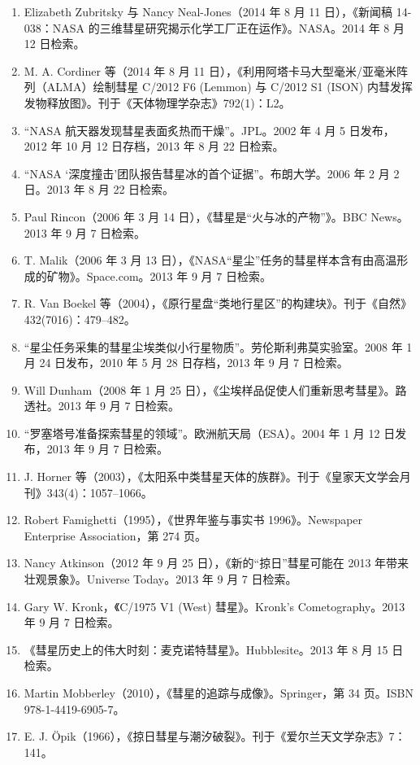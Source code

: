 \begin{enumerate}
\item Elizabeth Zubritsky 与 Nancy Neal-Jones（2014 年 8 月 11 日），《新闻稿 14-038：NASA 的三维彗星研究揭示化学工厂正在运作》。NASA。2014 年 8 月 12 日检索。
\item M. A. Cordiner 等（2014 年 8 月 11 日），《利用阿塔卡马大型毫米/亚毫米阵列（ALMA）绘制彗星 C/2012 F6 (Lemmon) 与 C/2012 S1 (ISON) 内彗发挥发物释放图》。刊于《天体物理学杂志》792(1)：L2。
\item “NASA 航天器发现彗星表面炙热而干燥”。JPL。2002 年 4 月 5 日发布，2012 年 10 月 12 日存档，2013 年 8 月 22 日检索。
\item “NASA ‘深度撞击’团队报告彗星冰的首个证据”。布朗大学。2006 年 2 月 2 日。2013 年 8 月 22 日检索。
\item Paul Rincon（2006 年 3 月 14 日），《彗星是“火与冰的产物”》。BBC News。2013 年 9 月 7 日检索。
\item T. Malik（2006 年 3 月 13 日），《NASA“星尘”任务的彗星样本含有由高温形成的矿物》。Space.com。2013 年 9 月 7 日检索。
\item R. Van Boekel 等（2004），《原行星盘“类地行星区”的构建块》。刊于《自然》432(7016)：479–482。
\item “星尘任务采集的彗星尘埃类似小行星物质”。劳伦斯利弗莫实验室。2008 年 1 月 24 日发布，2010 年 5 月 28 日存档，2013 年 9 月 7 日检索。
\item Will Dunham（2008 年 1 月 25 日），《尘埃样品促使人们重新思考彗星》。路透社。2013 年 9 月 7 日检索。
\item “罗塞塔号准备探索彗星的领域”。欧洲航天局（ESA）。2004 年 1 月 12 日发布，2013 年 9 月 7 日检索。
\item J. Horner 等（2003），《太阳系中类彗星天体的族群》。刊于《皇家天文学会月刊》343(4)：1057–1066。
\item Robert Famighetti（1995），《世界年鉴与事实书 1996》。Newspaper Enterprise Association，第 274 页。
\item Nancy Atkinson（2012 年 9 月 25 日），《新的“掠日”彗星可能在 2013 年带来壮观景象》。Universe Today。2013 年 9 月 7 日检索。
\item Gary W. Kronk，《C/1975 V1 (West) 彗星》。Kronk’s Cometography。2013 年 9 月 7 日检索。
\item 《彗星历史上的伟大时刻：麦克诺特彗星》。Hubblesite。2013 年 8 月 15 日检索。
\item Martin Mobberley（2010），《彗星的追踪与成像》。Springer，第 34 页。ISBN 978-1-4419-6905-7。
\item E. J. Öpik（1966），《掠日彗星与潮汐破裂》。刊于《爱尔兰天文学杂志》7：141。

\end{enumerate}
